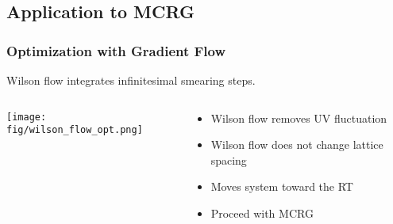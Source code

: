 \documentclass{beamer}
\begin{document}
  \subsection{Application to MCRG}
  \addtocounter{framenumber}{-1}

  \begin{frame}
    \frametitle{Optimization with Gradient Flow}
    Wilson flow integrates infinitesimal smearing steps.
    \begin{columns}[T]
      \begin{column}{.4\textwidth}
        \begin{block}{}
          \texttt{[image: fig/wilson\_flow\_opt.png]}
        \end{block}
      \end{column}
      \begin{column}{.6\textwidth}
        \begin{block}{}
          \begin{itemize}
            \item Wilson flow removes UV fluctuation
            \item Wilson flow does not change lattice spacing
            \item Moves system toward the RT
            \item Proceed with MCRG
          \end{itemize}
        \end{block}
      \end{column}
    \end{columns}
  \end{frame}
\end{document}
